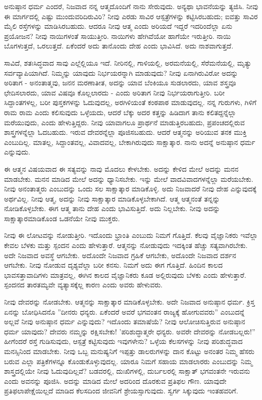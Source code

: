 ಅನುಷ್ಠಾನ ಧರ್ಮ ಎಂದರೆ, ನಿಜವಾದ ನನ್ನ ಆತ್ಮದೊಂದಿಗೆ ನಾನು ಸೇರುವುದು. ಅನ್ಯಥಾ ಭಾವನೆಯನ್ನು ತ್ಯಜಿಸಿ. ನೀವು ಈ ಮಾರ್ಗದಲ್ಲಿ ಎಷ್ಟು ಮುಂದುವರಿದಿರುವಿರಿ? ನೀವು ಎರಡು ಸಾವಿರ ಆಸ್ಪತ್ರೆಗಳನ್ನು ಕಟ್ಟಿಸಿರಬಹುದು; ಐವತ್ತು ಸಾವಿರ ಮೈಲಿ ರಸ್ತೆಗಳನ್ನು ಮಾಡಿಸಿರಬಹುದು. ಆದರೂ ನೀವು ಆತ್ಮ ಎಂದು ಅರಿಯದೆ ಇದ್ದರೆ ಇದರಿಂದೆಲ್ಲಾ ಏನು ಪ್ರಯೋಜನ? ನೀವು ನಾಯಿಗಳಂತೆ ಸಾಯುತ್ತೀರಿ. ನಾಯಿಗಳು ಹೇಗಿವೆಯೋ ಹಾಗೆಯೇ ಇರುತ್ತೀರಿ. ನಾಯಿ ಬೊಗಳುತ್ತದೆ, ಒರಲುತ್ತದೆ. ಏಕೆಂದರೆ ಅದು ತಾನೊಂದು ದೇಹ ಎಂದು ಭಾವಿಸಿದೆ. ಅದು ನಾಶವಾಗುತ್ತದೆ.

ಸಾವಿದೆ, ಶತಃಸಿದ್ಧವಾದ ಸಾವು ಎಲ್ಲೆಲ್ಲಿಯೂ ಇದೆ. ನೀರಿನಲ್ಲಿ, ಗಾಳಿಯಲ್ಲಿ, ಅರಮನೆಯಲ್ಲಿ, ಸೆರೆಮನೆಯಲ್ಲಿ, ಮೃತ್ಯು ಸರ್ವವ್ಯಾಪಿಯಾಗಿದೆ. ನಿಮ್ಮನ್ನು ಯಾವುದು ನಿರ್ಭಯರನ್ನಾಗಿ ಮಾಡುವುದು? ನೀವು ಏನಾಗಿರುವಿರೋ ಅದನ್ನು ಅರಿತಾಗ - ಅನಂತಾತ್ಮವು, ಜನನ ಮರಣಾತೀತ, ಅದನ್ನು ಯಾವ ಬೆಂಕಿಯೂ ಸುಡಲಾರದು, ಯಾವ ಶಸ್ತ್ರವೂ ಛೇದಿಸಲಾರದು, ಯಾವ ವಿಷವೂ ಕೊಲ್ಲಲಾರದು - ಎಂದು ಅರಿತಾಗ ನೀವು ನಿರ್ಭಯರಾಗುತ್ತೀರಿ. ಬರೀ ಸಿದ್ದಾಂತಗಳಲ್ಲ, ಬರೀ ಪುಸ್ತಕಗಳನ್ನು ಓದುವುದಲ್ಲ, ಅರಗಿಳಿಯಂತೆ ಕಂಠಪಾಠ ಮಾಡುವುದಲ್ಲ. ನನ್ನ ಗುರುಗಳು, ಗಿಳಿಗೆ ರಾಮ ರಾಮ ಎಂದು ಕಲಿಸುವುದು ಒಳ್ಳೆಯದು, ಆದರೆ ಬೆಕ್ಕು ಅದರ ಕತ್ತನ್ನು ಹಿಡಿದಾಗ ತಾನು ಕಲಿತದ್ದನ್ನೆಲ್ಲಾ ಮರೆಯುವುದು, ಎಂದು ಹೇಳುತ್ತಿದ್ದರು. ನೀವು ಯಾವಾಗಲೂ ಪ್ರಾರ್ಥನೆ ಮಾಡುತ್ತಿರಬಹುದು, ಪ್ರಪಂಚದಲ್ಲಿರುವ ಶಾಸ್ತ್ರಗಳನ್ನೆಲ್ಲಾ ಓದಬಹುದು. ಇರುವ ದೇವರನ್ನೆಲ್ಲಾ ಪೂಜಿಸಬಹುದು. ಆದರೆ ಆತ್ಮನನ್ನು ಅರಿಯುವ ತನಕ ಮುಕ್ತಿ ಎಂಬುದಿಲ್ಲ. ಮಾತಲ್ಲ, ಸಿದ್ದಾಂತವಲ್ಲ, ವಿವಾದವಲ್ಲ, ಬೇಕಾಗಿರುವುದು ಸಾಕ್ಷಾತ್ಕಾರ. ನಾನು ಅದನ್ನೆ ಅನುಷ್ಠಾನ ಧರ್ಮ ಎನ್ನುವುದು.

ಈ ಆತ್ಮನ ವಿಷಯವಾದ ಈ ಸತ್ಯವನ್ನು ನಾವು ಮೊದಲು ಕೇಳಬೇಕು. ಅದನ್ನು ಕೇಳಿದ ಮೇಲೆ ಅದನ್ನು ಮನನ ಮಾಡಬೇಕು. ಮನನ ಮಾಡಿದ ಮೇಲೆ ಅದನ್ನು ಧ್ಯಾನಿಸಬೇಕು. ಇನ್ನು ಮೇಲೆ ವಾದವಿವಾದಗಳನ್ನೆಲ್ಲಾ ಮರೆಯಬೇಕು. ನೀವು ಅನಂತಾತ್ಮರು ಎಂಬುದನ್ನು ಒಂದು ಸಲ ಸಾಕ್ಷಾತ್ಕಾರ ಮಾಡಿಕೊಳ್ಳಿ. ಅದು ನಿಜವಾದರೆ ನೀವು ದೇಹ ಎನ್ನುವುದಕ್ಕೆ ಅರ್ಥವಿಲ್ಲ. ನೀವು ಆತ್ಮ, ಅದನ್ನು ನೀವು ಸಾಕ್ಷಾತ್ಕಾರ ಮಾಡಿಕೊಳ್ಳಬೇಕಾಗಿದೆ. ಆತ್ಮ ಆತ್ಮನಂತೆ ತನ್ನನ್ನು ನೋಡಿಕೊಳ್ಳಬೇಕು. ಈಗ ಆತ್ಮ ತಾನು ದೇಹ ಎಂದು ಭಾವಿಸುತ್ತಿದೆ. ಅದು ನಿಲ್ಲಬೇಕು. ನೀವು ಅದನ್ನು ಸಾಕ್ಷಾತ್ಕಾರಮಾಡಿಕೊಂಡ ಒಡನೆಯೇ ನೀವು ಮುಕ್ತರು.

ನೀವು ಈ ಲೋಟವನ್ನು ನೋಡುತ್ತೀರಿ. ಇದೊಂದು ಭ್ರಾಂತಿ ಎಂಬುದು ನಿಮಗೆ ಗೊತ್ತಿದೆ. ಕೆಲವು ವೈಜ್ಞಾನಿಕರು ಇವೆಲ್ಲಾ ಕೇವಲ ಬೆಳಕು ಮತ್ತು ಸ್ಪಂದನ ಎಂದು ಹೇಳುತ್ತಾರೆ. ಆತ್ಮನನ್ನು ನೋಡುವುದು ಇದಕ್ಕಿಂತ ಹೆಚ್ಚು ಸತ್ಯವಾಗಿರಬೇಕು. ಅದೇ ನಿಜವಾದ ಅವಸ್ಥೆ ಆಗಬೇಕು. ಅದೊಂದೇ ನಿಜವಾದ ಗ್ರಹಿಕೆ ಆಗಬೇಕು, ಅದೊಂದೇ ನಿಜವಾದ ದರ್ಶನ ಆಗಬೇಕು. ನೀವು ನೋಡುವ ದೃಶ್ಯವೆಲ್ಲಾ ಬರೀ ಕನಸು. ನಿಮಗೆ ಅದು ಈಗ ಗೊತ್ತಿದೆ. ಹಿಂದಿನ ಕಾಲದ ಭಾವಸತ್ತಾವಾದಿಗಳು ಮಾತ್ರವಲ್ಲ, ಈಗಿನ ಕಾಲದ ವೈಜ್ಞಾನಿಕರು ಕೂಡ ಅಲ್ಲಿರುವುದು ಬೆಳಕು ಎಂದು ಹೇಳುತ್ತಾರೆ. ಸ್ಪಂದನದ ತಾರತಮ್ಯವೇ ವ್ಯತ್ಯಾಸಕ್ಕೆಲ್ಲ ಕಾರಣ ಎಂದು ಅವರು ಹೇಳುವರು.

ನೀವು ದೇವರನ್ನು ನೋಡಬೇಕು. ಆತ್ಮನನ್ನು ಸಾಕ್ಷಾತ್ಕಾರ ಮಾಡಿಕೊಳ್ಳಬೇಕು. ಅದೇ ನಿಜವಾದ ಅನುಷ್ಠಾನ ಧರ್ಮ. ಕ್ರಿಸ್ತ ಏನನ್ನು ಬೋಧಿಸಿದನೊ ''ದೀನರು ಧನ್ಯರು. ಏಕೆಂದರೆ ಅವರೆ ಭಗವಂತನ ರಾಜ್ಯಕ್ಕೆ ಹೋಗುವವರು'' ಎಂಬುದನ್ನೆ ಅಲ್ಲವೆ ನೀವು ಅನುಷ್ಠಾನ ಧರ್ಮ ಎನ್ನುವುದು? ಇದೊಂದು ತಮಾಷೆಯೆ? ನೀವು ಆಲೋಚಿಸುತ್ತಿರುವ ಅನುಷ್ಠಾನ ಧರ್ಮ ಯಾವುದು? ದೇವರು ನಮ್ಮನ್ನು ರಕ್ಷಿಸಬೇಕು! 'ಪರಿಶುದ್ಧಾತ್ಮರೇ ಧನ್ಯರು. ಅವರೇ ದೇವರನ್ನು ನೋಡಬಲ್ಲರು!” ಹೀಗೆಂದರೆ ರಸ್ತೆ ಗುಡಿಸುವುದು, ಆಸ್ಪತ್ರೆ ಕಟ್ಟಿಸುವುದು ಇವುಗಳೇನು? ಒಳ್ಳೆಯ ಕೆಲಸಗಳನ್ನು ನೀವು ಪರಿಶುದ್ಧವಾದ ಮನಸ್ಸಿನಿಂದ ಮಾಡಬೇಕು. ನೀವು ಒಬ್ಬ ಮನುಷ್ಯನಿಗೆ ಇಪ್ಪತ್ತು ಡಾಲರುಗಳನ್ನು ದಾನ ಕೊಟ್ಟು ಅನಂತರ ನಿಮ್ಮ ಹೆಸರು ಬರುವ ಎಲ್ಲಾ ಪತ್ರಿಕೆಗಳನ್ನೂ ಕೊಂಡುಕೊಳ್ಳುವುದಲ್ಲ. ಯಾರೂ ನಿಮಗೆ ಸಹಾಯ ಮಾಡಲಾರರು ಎಂಬುದನ್ನು ನಿಮ್ಮ ಶಾಸ್ತ್ರದಲ್ಲಿಯೇ ನೀವು ಓದುವುದಿಲ್ಲವೆ? ಬಡವರಲ್ಲಿ, ದುಃಖಿಗಳಲ್ಲಿ, ದುರ್ಬಲರಲ್ಲಿ ಸಾಕ್ಷಾತ್ ಭಗವಂತನೇ ಇರುವನು ಎಂದು ಅವನನ್ನು ಪೂಜಿಸಿ. ಅದನ್ನು ಮಾಡಿದ ಮೇಲೆ ಅದರಿಂದ ದೊರಕುವ ಪ್ರತಿಫಲ ಗೌಣ. ಯಾವುದೇ ಪ್ರತಿಫಲಾಪೇಕ್ಷೆಯಿಲ್ಲದೆ ಮಾಡಿದ ಕೆಲಸದಿಂದ ಜೀವನಿಗೆ ಶ್ರೇಯಸ್ಸಾಗುವುದು. ಸ್ವರ್ಗ ಸಿಕ್ಕುವುದು ಇಂತಹವರಿಗೆ.


